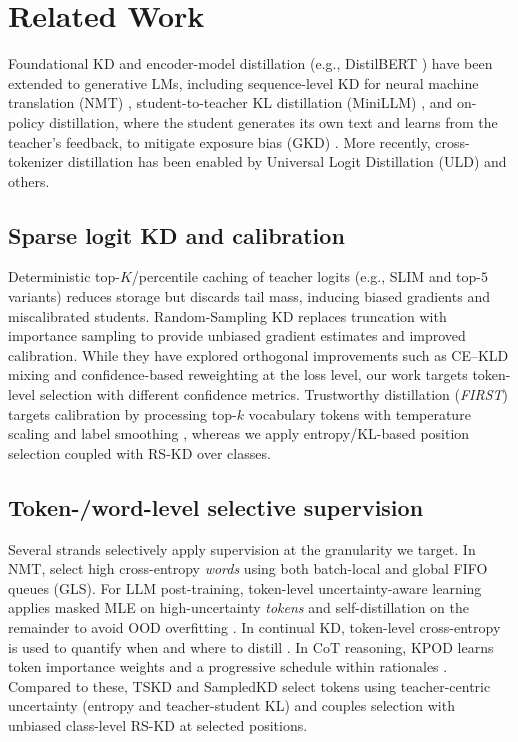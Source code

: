 \documentclass[11pt]{article}
\begin{document}
\section{Related Work}

Foundational KD \citep{hinton2015distillation} and encoder-model distillation (e.g., DistilBERT \citep{sanh2019distilbert}) have been extended to generative LMs, including sequence-level KD for neural machine translation (NMT) \citep{kim2016sequencekd}, student-to-teacher KL distillation (MiniLLM) \citep{gu2023minillm}, and on-policy distillation, where the student generates its own text and learns from the teacher's feedback, to mitigate exposure bias (GKD) \citep{agarwal2024gkd}.
More recently, cross-tokenizer distillation has been enabled by Universal Logit Distillation (ULD) \citep{boizard2024uld} and others.

\subsection{Sparse logit KD and calibration}
Deterministic top-$K$/percentile caching of teacher logits (e.g., SLIM \citep{raman2023slim} and top-$5$ variants) reduces storage but discards tail mass, inducing biased gradients and miscalibrated students.
Random-Sampling KD \citep{anshumann2025sparse} replaces truncation with importance sampling to provide unbiased gradient estimates and improved calibration.
While they have explored orthogonal improvements such as CE--KLD mixing and confidence-based reweighting at the loss level, our work targets token-level selection with different confidence metrics.
Trustworthy distillation (\emph{FIRST}) targets calibration by processing top-$k$ vocabulary tokens with temperature scaling and label smoothing \citep{shum2024first}, whereas we apply entropy/KL-based position selection coupled with RS-KD over classes.

\subsection{Token-/word-level selective supervision} Several strands selectively apply supervision at the granularity we target. In NMT, \citet{wang2021selectivekd} select high cross-entropy \emph{words} using both batch-local and global FIFO queues (GLS). For LLM post-training, token-level uncertainty-aware learning applies masked MLE on high-uncertainty \emph{tokens} and self-distillation on the remainder to avoid OOD overfitting \citep{liu2025tokenlevel}. In continual KD, token-level cross-entropy is used to quantify when and where to distill \citep{zhang2023continualkd}. In CoT reasoning, KPOD learns token importance weights and a progressive schedule within rationales \citep{feng2024kpod}.
Compared to these, TSKD and SampledKD select tokens using teacher-centric uncertainty (entropy and teacher-student KL) and couples selection with unbiased class-level RS-KD at selected positions.
\end{document}
